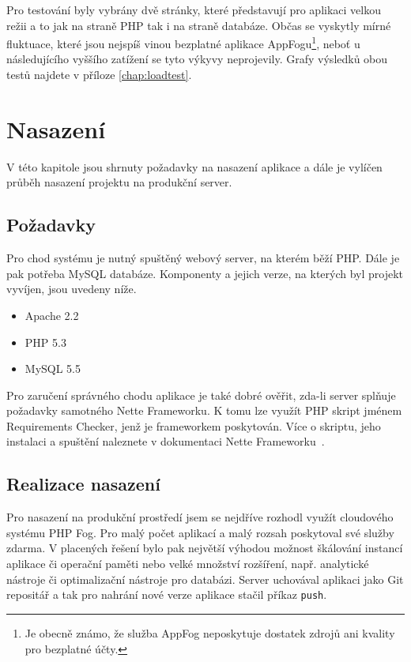 \documentclass[11pt,twoside,a4paper]{book}
\begin{document}
Pro testování byly vybrány dvě stránky, které představují pro aplikaci velkou režii a to jak na straně PHP tak i na straně databáze. Občas se vyskytly mírné fluktuace, které jsou nejspíš vinou bezplatné aplikace AppFogu\footnote{Je obecně známo, že služba AppFog neposkytuje dostatek zdrojů ani kvality pro bezplatné účty.}, neboť u následujícího vyššího zatížení se tyto výkyvy neprojevily. Grafy výsledků obou testů najdete v příloze \ref{chap:loadtest}.

\chapter{Nasazení}
V této kapitole jsou shrnuty požadavky na nasazení aplikace a dále je vylíčen průběh nasazení projektu na produkční server.

\section{Požadavky}
Pro chod systému je nutný spuštěný webový server, na kterém běží PHP. Dále je pak potřeba MySQL databáze. Komponenty a jejich verze, na kterých byl projekt vyvíjen, jsou uvedeny níže.

\begin{itemize}
	\item Apache 2.2
	\item PHP 5.3
	\item MySQL 5.5
\end{itemize}

Pro zaručení správného chodu aplikace je také dobré ověřit, zda-li server splňuje požadavky samotného Nette Frameworku. K tomu lze využít PHP skript jménem Requirements Checker, jenž je frameworkem poskytován. Více o skriptu, jeho instalaci a spuštění naleznete v dokumentaci Nette Frameworku~\cite{checker}.

\section{Realizace nasazení}
Pro nasazení na produkční prostředí jsem se nejdříve rozhodl využít cloudového systému PHP Fog. Pro malý počet aplikací a malý rozsah poskytoval své služby zdarma. V placených řešení bylo pak největší výhodou možnost škálování instancí aplikace či operační paměti nebo velké množství rozšíření, např. analytické nástroje či optimalizační nástroje pro databázi. Server uchovával aplikaci jako Git repositář a tak pro nahrání nové verze aplikace stačil příkaz \verb|push|.
\end{document}
